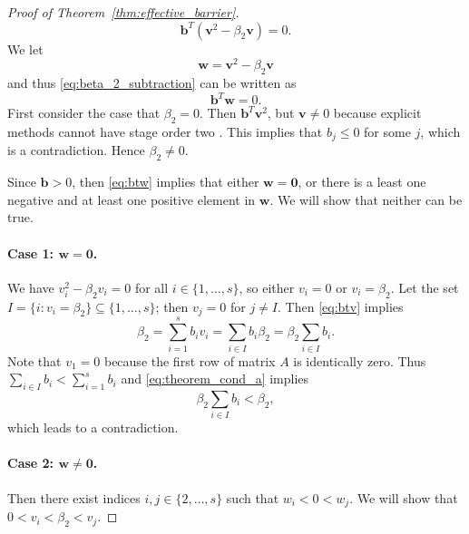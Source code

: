 \begin{proof}[Proof of Theorem~\ref{thm:effective_barrier}]
\begin{equation}
		\bm{b}^T(\bm{v}^2 - \beta_2\bm{v}) = 0.
	\end{equation}
	We let
	\begin{equation*} 
		\bm{w} = \bm{v}^{2} - \beta_{2}\bm{v}
	\end{equation*}    
	and thus \eqref{eq:beta_2_subtraction} can be written as 
	\begin{equation}\label{eq:btw}
		\bm{b}^T\bm{w} = 0.
	\end{equation}
	First consider the case that $\beta_2 = 0$. 
	Then $\bm{b}^T\bm{v}^2$, but $\bm{v }\neq 0$ because explicit methods 
	cannot have stage order two \cite{Ruuth2002}. This implies that $b_j \leq 0$ 
	for some $j$, which is a contradiction. Hence $\beta_2 \neq 0$.
	
	Since $\bm{b}>0$, then \eqref{eq:btw} implies that either 
	$\bm{w} = \bm{0}$, or there is a least one negative and at least one positive 
	element in $\bm{w}$.
	We will show that neither can be true.
	
	\paragraph{Case 1: $\bm{w} = \bm{0}$.}
	We have $v_i^2 - \beta_2 v_i = 0$ for all $i \in \{1, \dots, s\}$, so either 
	$v_i = 0$ or $v_i = \beta_2$.
	Let the set $I = \{i : v_i = \beta_2\} \subseteq \{1, \dots, s\}$; then 
	$v_j = 0$ for $j \neq I$.
	Then \eqref{eq:btv} implies 
	\begin{equation*}
		\beta_2 = \sum_{i=1}^s b_i v_i = \sum_{i \in I}b_i\beta_2 = \beta_2\sum_{i \in I}b_i.
	\end{equation*}
	Note that $v_1 = 0$ because the first row of matrix $A$ is identically zero. 
	Thus $\sum_{i\in I}b_i < \sum_{i=1}^s b_i$ and \eqref{eq:theorem_cond_a} 
	implies
	\begin{equation*}
		\beta_2\sum_{i \in I}b_i< \beta_2,
	\end{equation*} 
	which leads to a contradiction.
	
	\paragraph{Case 2: $\bm{w} \neq \bm{0}$.}
	Then there exist indices $i, j \in \{2, \dots, s\}$ such that $w_i < 0 < w_j$.
	We will show that $0 < v_i < \beta_2 < v_j$.


\end{proof}
